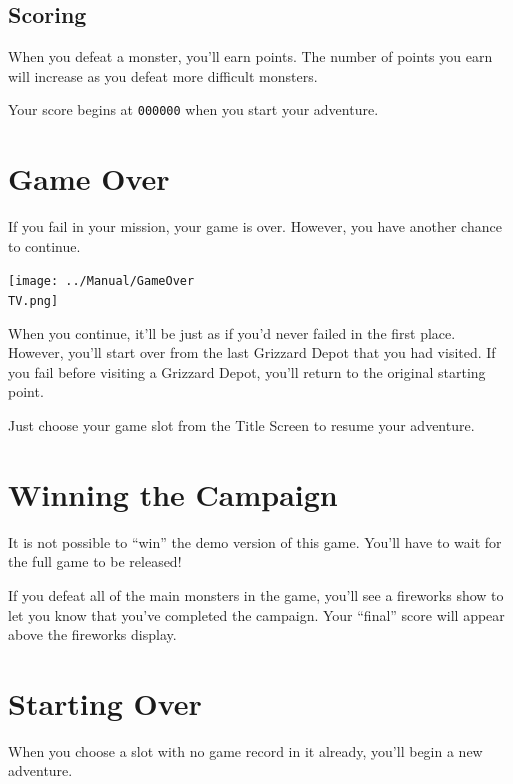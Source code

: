 \documentclass[10pt,twocolumn,openany,article]{memoir}
\newcommand\TV{NTSC}
\newcommand\TV{PAL}
\newcommand\TV{SECAM}
\begin{document}
\begin{description}
\subsection{Scoring}

When you  defeat a monster, you'll  earn points. The number  of points
you earn will increase as you defeat more difficult monsters.

Your score begins at \texttt{000000} when you start your adventure.

\section{Game Over}

If  you fail  in your  mission,  your game  is over.  However, you  have
another chance to continue.

\texttt{[image: ../Manual/GameOver\\TV.png]}

When you continue, it'll  be just as if you'd never  failed in the first
place. However, you'll start over from  the last Grizzard Depot that you
had visited. If you fail before visiting a Grizzard Depot, you'll return
to the original starting point.

Just  choose   your  game   slot  from  the   Title  Screen   to  resume
your adventure.

\section{Winning the Campaign}\label{Winning the Campaign}

\ifdefined\DEMO

It is not possible to ``win'' the demo version of this game. You'll have
to wait for the full game to be released!

\else

If  you  defeat  all of  the  main  monsters  in  the game,  you'll  see
a fireworks  show to let  you know  that you've completed  the campaign.
Your ``final'' score will appear above the fireworks display.

\fi

\section{Starting Over}\label{Starting Your Adventure Over}

When you choose a  slot with no game record in  it already, you'll begin
a new adventure.


\end{description}
\end{document}

